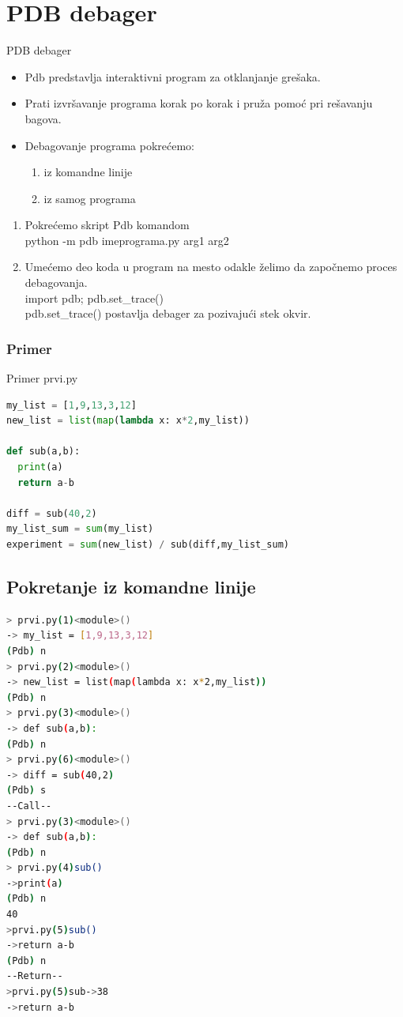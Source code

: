 \documentclass{beamer}
\begin{document}
\section{PDB debager}
 \begin{frame}{PDB debager}
\begin{itemize}
\item Pdb predstavlja interaktivni program za otklanjanje grešaka.
\item Prati izvršavanje programa korak po korak i pruža pomoć pri rešavanju bagova.
\item Debagovanje programa pokrećemo:
\begin{enumerate}
\item iz komandne linije
\item iz samog programa
\end{enumerate}
\end{itemize}
\begin{enumerate}
\item Pokrećemo skript Pdb komandom  \\ {\color{blue}python -m pdb imeprograma.py arg1 arg2}
\item Umećemo deo koda u program na mesto odakle želimo da započnemo proces debagovanja.
\\ {\color{blue}import pdb; pdb.set\_trace()}
\\ {\color{blue}pdb.set\_trace()} postavlja debager za pozivajući stek okvir.
\end{enumerate}
\end{frame}
\begin{frame}[fragile] %
\frametitle{Primer}
\begin{exampleblock}{Primer prvi.py}
  \begin{lstlisting}[language = python]
my_list = [1,9,13,3,12]
new_list = list(map(lambda x: x*2,my_list))

def sub(a,b):
  print(a)
  return a-b
  
diff = sub(40,2)
my_list_sum = sum(my_list)
experiment = sum(new_list) / sub(diff,my_list_sum)
   \end{lstlisting}
   \end{exampleblock}

\end{frame}
\subsection{Pokretanje iz komandne linije}
\begin{frame}[fragile]
\begin{lstlisting}[language = bash]
> prvi.py(1)<module>()
-> my_list = [1,9,13,3,12]
(Pdb) n
> prvi.py(2)<module>()
-> new_list = list(map(lambda x: x*2,my_list))
(Pdb) n
> prvi.py(3)<module>()
-> def sub(a,b):
(Pdb) n
> prvi.py(6)<module>()
-> diff = sub(40,2)
(Pdb) s
--Call--
> prvi.py(3)<module>()
-> def sub(a,b):
(Pdb) n
> prvi.py(4)sub()
->print(a)
(Pdb) n
40
>prvi.py(5)sub()
->return a-b
(Pdb) n
--Return--
>prvi.py(5)sub->38
->return a-b
\end{lstlisting}
\end{frame}
\end{document}
